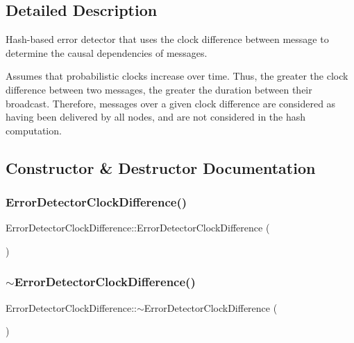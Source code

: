 \subsection{Detailed Description}
Hash-\/based error detector that uses the clock difference between message to determine the causal dependencies of messages. 

Assumes that probabilistic clocks increase over time. Thus, the greater the clock difference between two messages, the greater the duration between their broadcast. Therefore, messages over a given clock difference are considered as having been delivered by all nodes, and are not considered in the hash computation. 

\subsection{Constructor \& Destructor Documentation}
\mbox{\label{class_error_detector_clock_difference_a5edb355be9179cd604d3e7f946846c55}} 
\subsubsection{\texorpdfstring{Error\+Detector\+Clock\+Difference()}{ErrorDetectorClockDifference()}}
{\footnotesize\ttfamily Error\+Detector\+Clock\+Difference\+::\+Error\+Detector\+Clock\+Difference (\begin{DoxyParamCaption}{ }\end{DoxyParamCaption})}

\mbox{\label{class_error_detector_clock_difference_a19bda307bcb9a8974a97fdf56fb77b8f}} 
\subsubsection{\texorpdfstring{$\sim$\+Error\+Detector\+Clock\+Difference()}{~ErrorDetectorClockDifference()}}
{\footnotesize\ttfamily Error\+Detector\+Clock\+Difference\+::$\sim$\+Error\+Detector\+Clock\+Difference (\begin{DoxyParamCaption}{ }\end{DoxyParamCaption})\hspace{0.3cm}{\ttfamily [virtual]}}



